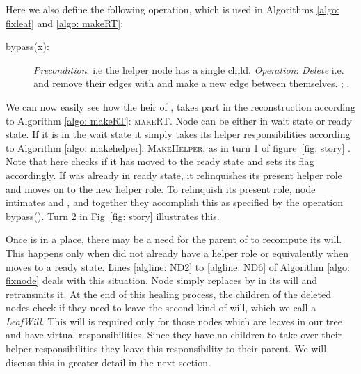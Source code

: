 \documentclass[11pt]{article}
\begin{document}
 Here we also define the following operation, which is used in Algorithms  \ref{algo: fixleaf} and \ref{algo: makeRT}:
\begin{description}
\item[bypass(x):] \emph{Precondition}:  i.e the helper node has a single child. \emph{Operation}:
\emph{Delete}  i.e.  and   remove their edges with  and make a
new edge between themselves.  ; .
\end{description}

  We can now easily see how the heir of ,  takes part in the reconstruction according to Algorithm
\ref{algo: makeRT}: \textsc{makeRT}. Node  can be either in wait state or ready state. If it is in the wait
state it simply takes its helper responsibilities according to Algorithm \ref{algo: makehelper}: \textsc{MakeHelper},
as in turn 1 of figure~\ref{fig: story} .
Note that here  checks  if it has moved to the ready state and sets its  flag accordingly.
 If  was already in ready state, it relinquishes its present helper role and moves on to the new helper
role. To relinquish its present role, node  intimates   and , and together they accomplish
this as specified by the operation bypass(). Turn 2 in Fig~\ref{fig: story} illustrates this. 

Once  is in a place, there may be a need for the parent of  to recompute its will. This happens only when
 did not already have a helper role or equivalently when  moves to a ready state. Lines \ref{algline:
ND2} to \ref{algline: ND6} of Algorithm \ref{algo: fixnode} deals with this situation. Node  simply
replaces  by  in its will and retransmits it.  At the end of this healing process, the children of the
deleted nodes check if they need to leave the second kind of will, which we call a \emph{LeafWill}. This will is
required only for those nodes which are leaves in our tree and have virtual responsibilities. Since they have no
children to take over their helper responsibilities they leave this responsibility to their parent. We will discuss
this in greater detail in the next section.
\end{document}
